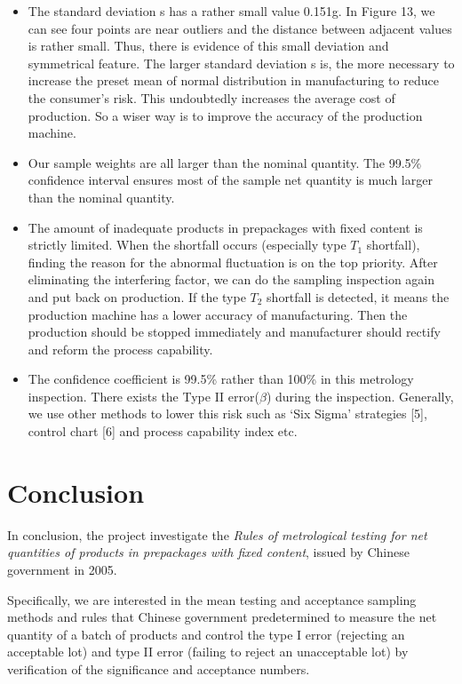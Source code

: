 \documentclass[a4paper]{article}
\begin{document}
\begin{itemize}
\item The standard deviation s has a rather small value 0.151g. In Figure 13, we can see four points are near outliers and the distance between adjacent values is rather small. Thus, there is evidence of this small deviation and symmetrical feature. The larger standard deviation s is, the more necessary to increase the preset mean of normal distribution in manufacturing to reduce the consumer's risk. This undoubtedly increases the average cost of production. So a wiser way is to improve the accuracy of the production machine. 
\item Our sample weights are all larger than the nominal quantity.  The 99.5\% confidence interval ensures most of the sample net quantity is much larger than the nominal quantity. 
\item The amount of inadequate products in prepackages with fixed content is strictly limited. When the shortfall occurs (especially type $T_{1}$ shortfall), finding the reason for the abnormal fluctuation is on the top priority. After eliminating the interfering factor, we can do the sampling inspection again and put back on production.  If the type $ T_{2} $ shortfall is detected, it means the production machine has a lower accuracy of manufacturing. Then the production should be stopped immediately and manufacturer should rectify and reform the process capability.  
\item The confidence coefficient is 99.5\% rather than 100\% in this metrology inspection. There exists the Type II error($ \beta $) during the inspection. Generally, we use other methods to lower this risk such as `Six Sigma' strategies [5], control chart [6] and process capability index etc. 
\end{itemize}

\section{Conclusion}
In conclusion, the project investigate the \textit{Rules of metrological testing for net quantities of products in prepackages with fixed content}, issued by Chinese government in 2005.

Specifically, we are interested in the mean testing and acceptance sampling methods and rules that Chinese government predetermined to measure the net quantity of a batch of products and control the type I error (rejecting an acceptable lot) and type II error (failing to reject an unacceptable lot) by verification of the significance and acceptance numbers.
\end{document}
